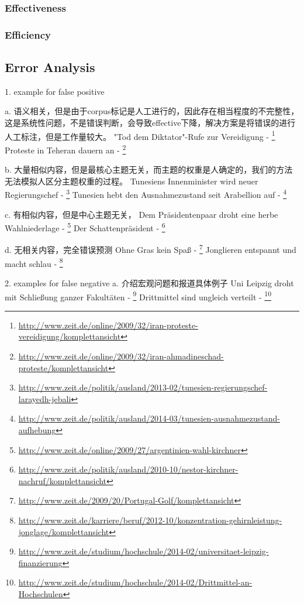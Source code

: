 \subsubsection{Effectiveness}

\subsubsection{Efficiency}

\subsection{Error Analysis}
\label{sec:5.5}

1. example for false positive

a. 语义相关，但是由于corpus标记是人工进行的，因此存在相当程度的不完整性，这是系统性问题，不是错误判断，会导致effective下降，解决方案是将错误的进行人工标注，但是工作量较大。
"Tod dem Diktator"-Rufe zur Vereidigung - 
\footnote{\url{http://www.zeit.de/online/2009/32/iran-proteste-vereidigung/komplettansicht}}
Proteste in Teheran dauern an - \footnote{\url{http://www.zeit.de/online/2009/32/iran-ahmadineschad-proteste/komplettansicht}}

b. 大量相似内容，但是最核心主题无关，而主题的权重是人确定的，我们的方法无法模拟人区分主题权重的过程。
Tunesiens Innenminister wird neuer Regierungschef - \footnote{\url{http://www.zeit.de/politik/ausland/2013-02/tunesien-regierungschef-larayedh-jebali}}
Tunesien hebt den Ausnahmezustand seit Arabellion auf - \footnote{\url{http://www.zeit.de/politik/ausland/2014-03/tunesien-ausnahmezustand-aufhebung}}

c. 有相似内容，但是中心主题无关，
Dem Präsidentenpaar droht eine herbe Wahlniederlage - \footnote{\url{http://www.zeit.de/online/2009/27/argentinien-wahl-kirchner}}
Der Schattenpräsident - \footnote{\url{http://www.zeit.de/politik/ausland/2010-10/nestor-kirchner-nachruf/komplettansicht}}

d. 无相关内容，完全错误预测
Ohne Gras kein Spaß - \footnote{\url{http://www.zeit.de/2009/20/Portugal-Golf/komplettansicht}}
Jonglieren entspannt und macht schlau - \footnote{\url{http://www.zeit.de/karriere/beruf/2012-10/konzentration-gehirnleistung-jonglage/komplettansicht}}

2. examples for false negative
a. 介绍宏观问题和报道具体例子
Uni Leipzig droht mit Schließung ganzer Fakultäten - \footnote{\url{http://www.zeit.de/studium/hochschule/2014-02/universitaet-leipzig-finanzierung}}
Drittmittel sind ungleich verteilt - \footnote{\url{http://www.zeit.de/studium/hochschule/2014-02/Drittmittel-an-Hochschulen}}

